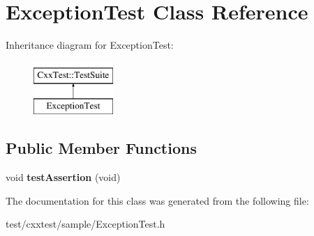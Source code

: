 \hypertarget{classExceptionTest}{\section{Exception\-Test Class Reference}
\label{classExceptionTest}
}
Inheritance diagram for Exception\-Test\-:\begin{figure}[H]
\begin{center}
\leavevmode
\includegraphics[height=2.000000cm]{classExceptionTest}
\end{center}
\end{figure}
\subsection*{Public Member Functions}
\begin{DoxyCompactItemize}
\item 
\hypertarget{classExceptionTest_a861cc742e3bd0038eaadeab6fb8d921b}{void {\bfseries test\-Assertion} (void)}\label{classExceptionTest_a861cc742e3bd0038eaadeab6fb8d921b}

\end{DoxyCompactItemize}


The documentation for this class was generated from the following file\-:\begin{DoxyCompactItemize}
\item 
test/cxxtest/sample/Exception\-Test.\-h\end{DoxyCompactItemize}
